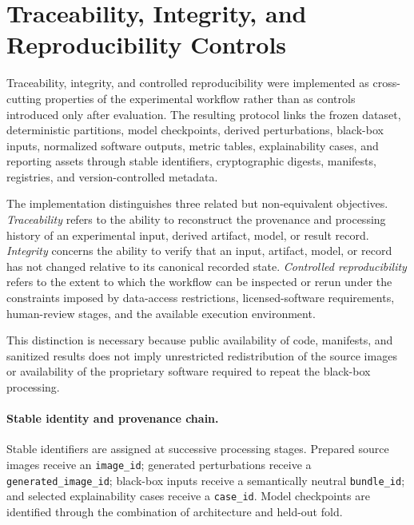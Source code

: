 \section{Traceability, Integrity, and Reproducibility Controls}
\label{sec:implementation-traceability}

Traceability, integrity, and controlled reproducibility were implemented as
cross-cutting properties of the experimental workflow rather than as controls
introduced only after evaluation. The resulting protocol links the frozen
dataset, deterministic partitions, model checkpoints, derived
perturbations, black-box inputs, normalized software outputs, metric tables,
explainability cases, and reporting assets through stable identifiers,
cryptographic digests, manifests, registries, and version-controlled metadata.

The implementation distinguishes three related but non-equivalent objectives.
\emph{Traceability} refers to the ability to reconstruct the provenance and
processing history of an experimental input, derived artifact, model, or result
record. \emph{Integrity} concerns the ability to verify that an input, artifact,
model, or record has not changed relative to its canonical recorded state.
\emph{Controlled reproducibility} refers to the extent to which the workflow can
be inspected or rerun under the constraints imposed by data-access restrictions,
licensed-software requirements, human-review stages, and the available execution
environment.

This distinction is necessary because public availability of code, manifests,
and sanitized results does not imply unrestricted redistribution of the source
images or availability of the proprietary software required to repeat the
black-box processing.

\paragraph{Stable identity and provenance chain.}

Stable identifiers are assigned at successive processing stages. Prepared
source images receive an \texttt{image\_id}; generated perturbations receive a
\texttt{generated\_image\_id}; black-box inputs receive a semantically neutral
\texttt{bundle\_id}; and selected explainability cases receive a
\texttt{case\_id}. Model checkpoints are identified through the
combination of architecture and held-out fold.

